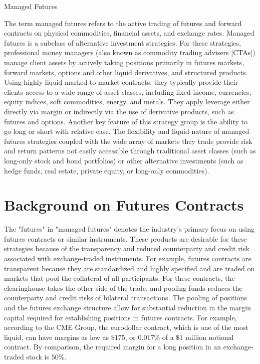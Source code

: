 \documentclass[11pt]{article}
\begin{document}
Managed Futures

The term managed futures refers to the active trading of futures and forward contracts on physical commodities, financial assets, and exchange rates. Managed futures is a subclass of alternative investment strategies. For these strategies, professional money managers (also known as commodity trading advisers [CTAs]) manage client assets by actively taking positions primarily in futures markets, forward markets, options and other liquid derivatives, and structured products. Using highly liquid marked-to-market contracts, they typically provide their clients access to a wide range of asset classes, including fixed income, currencies, equity indices, soft commodities, energy, and metals. They apply leverage either directly via margin or indirectly via the use of derivative products, such as futures and options. Another key feature of this strategy group is the ability to go long or short with relative ease. The flexibility and liquid nature of managed futures strategies coupled with the wide array of markets they trade provide risk and return patterns not easily accessible through traditional asset classes (such as long-only stock and bond portfolios) or other alternative investments (such as hedge funds, real estate, private equity, or long-only commodities).

\section*{Background on Futures Contracts}
The "futures" in "managed futures" denotes the industry's primary focus on using futures contracts or similar instruments. These products are desirable for these strategies because of the transparency and reduced counterparty and credit risk associated with exchange-traded instruments. For example, futures contracts are transparent because they are standardized and highly specified and are traded on markets that pool the collateral of all participants. For these contracts, the clearinghouse takes the other side of the trade, and pooling funds reduces the counterparty and credit risks of bilateral transactions. The pooling of positions and the futures exchange structure allow for substantial reduction in the margin capital required for establishing positions in futures contracts. For example, according to the CME Group, the eurodollar contract, which is one of the most liquid, can have margins as low as $\$ 175$, or $0.017 \%$ of a $\$ 1$ million notional contract. By comparison, the required margin for a long position in an exchange-traded stock is $50 \%$.
\end{document}

